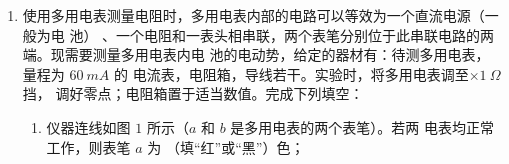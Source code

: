 \begin{enumerate}
\begin{enumerate}
\end{enumerate}
\begin{figure}[h!]
\centering
\begin{subfigure}{0.4\linewidth}
\centering
 
\caption{}\label{}
\end{subfigure}
\begin{subfigure}{0.4\linewidth}
\centering
 
\caption{}\label{}
\end{subfigure}
\begin{subfigure}{0.4\linewidth}
\centering
 
\caption{}\label{}
\end{subfigure}
\end{figure}




\item
{}
使用多用电表测量电阻时，多用电表内部的电路可以等效为一个直流电源（一般为电
池）
、一个电阻和一表头相串联，两个表笔分别位于此串联电路的两端。现需要测量多用电表内电
池的电动势，给定的器材有：待测多用电表，量程为 $ 60 \ mA $ 的
电流表，电阻箱，导线若干。实验时，将多用电表调至$ \times 1 \ \Omega $挡，
调好零点；电阻箱置于适当数值。完成下列填空：
\begin{enumerate}
\item
仪器连线如图 $ 1 $ 所示（$ a $ 和 $ b $ 是多用电表的两个表笔）。若两
电表均正常工作，则表笔 $ a $ 为 \underlinegap （填“红”或“黑”）色；
\begin{figure}[h!]
\centering

\end{figure}


\end{enumerate}
\end{enumerate}
